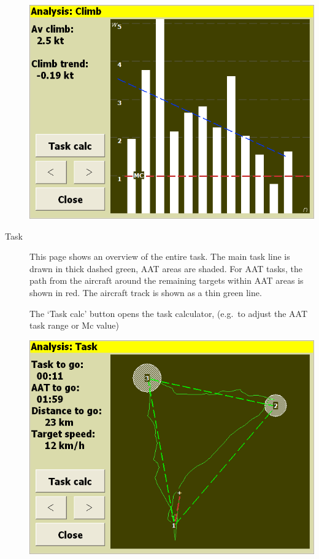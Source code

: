 \documentclass[a4paper,12pt]{refrep}
\begin{document}
\begin{description}
\begin{center}
\includegraphics[angle=0,width=\linewidth,keepaspectratio='true']{figures/analysis-climb.png}
\end{center}

\item[Task]
  This page shows an overview of the entire task.  The main task line
  is drawn in thick dashed green, AAT areas are shaded.  For AAT
  tasks, the path from the aircraft around the remaining targets within AAT
  areas is shown in red.  The aircraft track is shown as a thin green line.

  The `Task calc' button opens the task calculator,
  (e.g.\ to adjust the AAT task range or Mc value)

\begin{center}
\includegraphics[angle=0,width=\linewidth,keepaspectratio='true']{figures/analysis-task.png}
\end{center}

\end{description}
\end{document}
